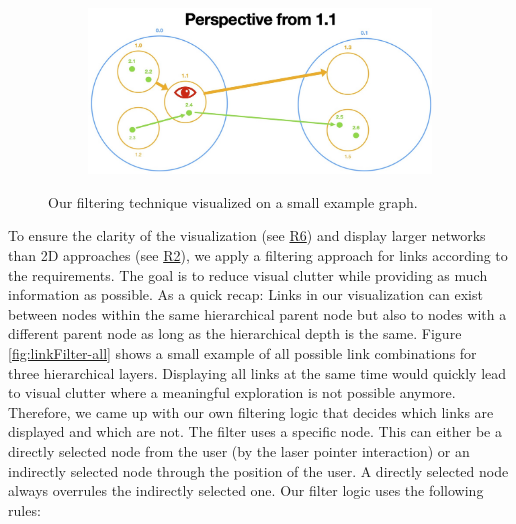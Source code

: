 \begin{figure}[p]
\begin{subfigure}{0.6\columnwidth}
        \label{fig:linkFilter-layer1}
    \end{subfigure}
    \begin{subfigure}{0.6\columnwidth}
        \centering
        \includegraphics[width=\textwidth]{graphics/filterLinks/layer1.jpg}
        \label{fig:linkFilter-layer2}
    \end{subfigure}
    \caption{Our filtering technique visualized on a small example graph.} %
  \end{figure}

To ensure the clarity of the visualization (see \hyperref[req:R6]{R6}) and display larger networks than 2D approaches (see \hyperref[req:R2]{R2}), we apply a filtering approach for links according to the requirements. 
The goal is to reduce visual clutter while providing as much information as possible. 
As a quick recap: Links in our visualization can exist between nodes within the same hierarchical parent node but also to nodes with a different parent node as long as the hierarchical depth is the same. Figure \ref{fig:linkFilter-all} shows a small example of all possible link combinations for three hierarchical layers.
Displaying all links at the same time would quickly lead to visual clutter where a meaningful exploration is not possible anymore. 
Therefore, we came up with our own filtering logic that decides which links are displayed and which are not. 
The filter uses a specific node. This can either be a directly selected node from the user (by the laser pointer interaction) or an indirectly selected node through the position of the user. A directly selected node always overrules the indirectly selected one. Our filter logic uses the following rules:

